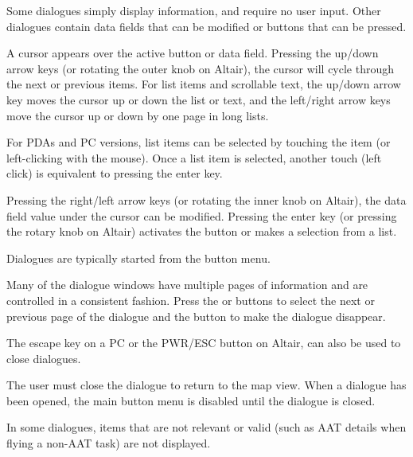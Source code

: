 Some dialogues simply display information, and require no user input. Other
dialogues contain data fields that can be modified or buttons that can be pressed.  

A cursor appears over the active button or data field. Pressing the up/down
arrow keys (or rotating the outer knob on Altair), the cursor will cycle
through the next or previous items. For list items and scrollable text, the
up/down arrow key moves the cursor up or down the list or text, and the
left/right arrow keys move the cursor up or down by one page in long lists.

For PDAs and PC versions, list items can be selected by touching the item (or
left-clicking with the mouse). Once a list item is selected, another touch
(left click) is equivalent to pressing the enter key.

Pressing the right/left arrow keys (or rotating the inner knob on Altair), the
data field value under the cursor can be modified. Pressing the enter key (or
pressing the rotary knob on Altair) activates the button or makes a selection
from a list.

Dialogues are typically started from the button menu.  

Many of the dialogue windows have multiple pages of information and are controlled
in a consistent fashion. Press the \button{$<$} or \button{$>$} buttons to
select the next or previous page of the dialogue and the  button to
make the dialogue disappear.

The escape key on a PC or the PWR/ESC button on Altair, can also be used to
close dialogues.

The user must close the dialogue to return to the map view. When a dialogue
has been opened, the main button menu is disabled until the dialogue is closed.

In some dialogues, items that are not relevant or valid (such as AAT details when
flying a non-AAT task) are not displayed.


